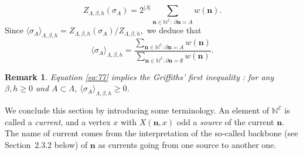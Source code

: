 \documentclass[a4paper,oneside,11pt]{article}
\newtheorem{remark}[theorem]{Remark}
\newcommand{\ee}{\end{equation}}
\newcommand{\be}{\begin{equation}}
\begin{document}
 \be \label{eq:expansion current}
Z_{\Lambda,\beta,h}(\sigma_A)=2^{|\Lambda|}\sum_{{\mathbf n}\in\mathbb N^{\mathcal E}:\,\partial{\mathbf n}=A}w({\mathbf n})
.\ee
Since 
$
\langle\sigma_A\rangle_{\Lambda,\beta,h}=Z_{\Lambda,\beta,h}(\sigma_A)/Z_{\Lambda,\beta,h},$
we deduce that 
\be\label{eq:77}
\langle\sigma_A\rangle_{\Lambda,\beta,h}=\frac{\sum_{\mathbf n\in\mathbb N^{\mathcal E}:\partial \mathbf n=A}w(
\mathbf n)}{\sum_{\mathbf n\in\mathbb N^{\mathcal E}:\partial \mathbf n=\emptyset}w(
\mathbf n)}.\ee

\begin{remark}Equation \eqref{eq:77} implies the Griffiths' first inequality \cite{Gri67}: for any $\beta,h\ge0$ and $A\subset \Lambda$,
$\langle\sigma_A\rangle_{\Lambda,\beta,h}\ge0$.
\end{remark}


We conclude this section by introducing some terminology. An element of $\mathbb N^{\mathcal E}$ is called a {\em current}, and a vertex $x$ with $X(\mathbf n,x)$ odd a {\em source} of the current $\mathbf n$.
The name of current comes from the interpretation of the so-called backbone (see Section~2.3.2 below) of $\mathbf n$ as currents going from one source to another one.
\end{document}
